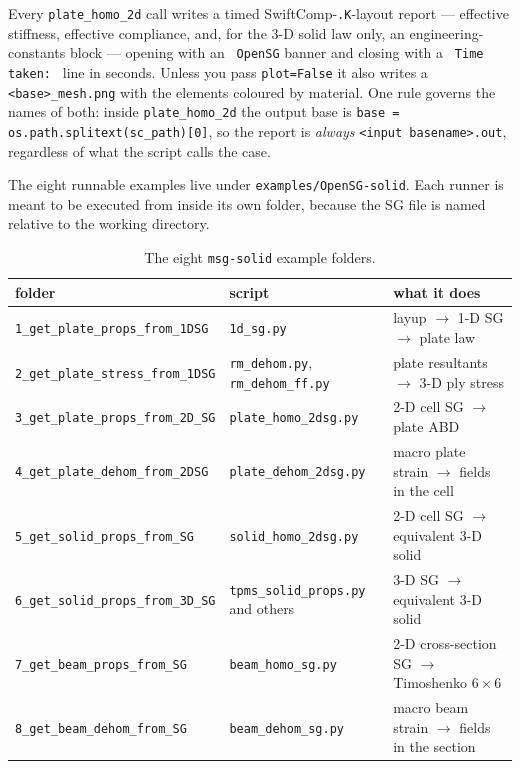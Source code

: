 Every \texttt{plate\_homo\_2d} call writes a timed SwiftComp-\texttt{.K}-layout
report --- effective stiffness, effective compliance, and, for the 3-D solid law
only, an engineering-constants block --- opening with an \texttt{ OpenSG} banner
and closing with a \texttt{ Time taken: } line in seconds. Unless you pass
\texttt{plot=False} it also writes a \texttt{<base>\_mesh.png} with the elements
coloured by material. One rule governs the names of both: inside
\texttt{plate\_homo\_2d} the output base is
\texttt{base = os.path.splitext(sc\_path)[0]}, so the report is
\emph{always} \texttt{<input basename>.out}, regardless of what the script calls
the case.

The eight runnable examples live under \texttt{examples/OpenSG-solid}. Each
runner is meant to be executed from inside its own folder, because the SG file
is named relative to the working directory.

\begin{table}[htbp]
\centering
\footnotesize
\begin{tabular}{lp{3.2cm}p{5.4cm}}
\toprule
folder & script & what it does \\
\midrule
\texttt{1\_get\_plate\_props\_from\_1DSG} & \texttt{1d\_sg.py} & layup $\rightarrow$ 1-D SG $\rightarrow$ plate law \\
\texttt{2\_get\_plate\_stress\_from\_1DSG} & \texttt{rm\_dehom.py}, \texttt{rm\_dehom\_ff.py} & plate resultants $\rightarrow$ 3-D ply stress \\
\texttt{3\_get\_plate\_props\_from\_2D\_SG} & \texttt{plate\_homo\_2dsg.py} & 2-D cell SG $\rightarrow$ plate ABD \\
\texttt{4\_get\_plate\_dehom\_from\_2DSG} & \texttt{plate\_dehom\_2dsg.py} & macro plate strain $\rightarrow$ fields in the cell \\
\texttt{5\_get\_solid\_props\_from\_SG} & \texttt{solid\_homo\_2dsg.py} & 2-D cell SG $\rightarrow$ equivalent 3-D solid \\
\texttt{6\_get\_solid\_props\_from\_3D\_SG} & \texttt{tpms\_solid\_props.py} and others & 3-D SG $\rightarrow$ equivalent 3-D solid \\
\texttt{7\_get\_beam\_props\_from\_SG} & \texttt{beam\_homo\_sg.py} & 2-D cross-section SG $\rightarrow$ Timoshenko $6\times6$ \\
\texttt{8\_get\_beam\_dehom\_from\_SG} & \texttt{beam\_dehom\_sg.py} & macro beam strain $\rightarrow$ fields in the section \\
\bottomrule
\end{tabular}
\caption{The eight \texttt{msg-solid} example folders.}
\label{tab:solid-examples}
\end{table}

